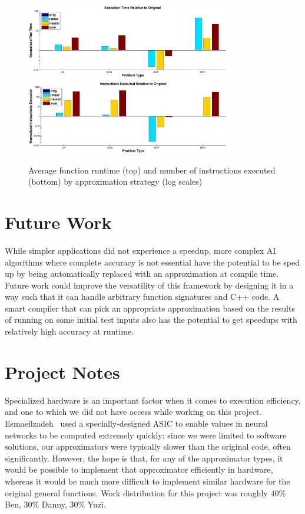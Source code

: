 \documentclass{article}
\begin{document}
\begin{figure}
  \centering
  \includegraphics[width=0.8\textwidth]{images/results_run_time}
  \includegraphics[width=0.8\textwidth]{images/results_instructions}
  \caption{Average function runtime (top) and number of instructions executed (bottom) by approximation strategy (log scales)}
  \label{fig:results_run_time}
\end{figure}

\section{Future Work}

While simpler applications did not experience a speedup, more complex AI algorithms where complete accuracy is not essential have the potential to be sped up by being automatically replaced with an approximation at compile time. Future work could improve the versatility of this framework by designing it in a way such that it can handle arbitrary function signatures and C++ code. A smart compiler that can pick an appropriate approximation based on the results of running on some initial test inputs also has the potential to get speedups with relatively high accuracy at runtime.

\section{Project Notes}
\label{sec:project_notes}

Specialized hardware is an important factor when it comes to execution efficiency, and one to which we did not have access while working on this project. Esmaeilzadeh~\cite{Esmaeilzadeh12} used a specially-designed ASIC to enable values in neural networks to be computed extremely quickly; since we were limited to software solutions, our approximators were typically slower than the original code, often significantly. However, the hope is that, for any of the approximator types, it would be possible to implement that approximator efficiently in hardware, whereas it would be much more difficult to implement similar hardware for the original general functions. Work distribution for this project was roughly 40\% Ben, 30\% Danny, 30\% Yuzi.



\end{document}
